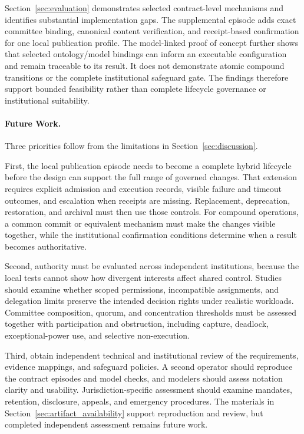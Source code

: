 \documentclass[journal]{IEEEtran}
\begin{document}
Section~\ref{sec:evaluation} demonstrates selected contract-level
mechanisms and identifies substantial implementation gaps.
The supplemental episode adds exact committee binding,
canonical content verification, and receipt-based confirmation
for one local publication profile. The model-linked proof of concept
further shows that selected ontology/model bindings can inform an
executable configuration and remain traceable to its result. It does not demonstrate
atomic compound transitions or the complete institutional
safeguard gate. The findings therefore support bounded
feasibility rather than complete lifecycle governance
or institutional suitability.

\paragraph{Future Work.}

Three priorities follow from the limitations in
Section~\ref{sec:discussion}.

First, the local publication episode needs to become a complete hybrid
lifecycle before the design can support the full range of governed changes.
That extension requires explicit admission and execution records, visible
failure and timeout outcomes, and escalation when receipts are missing.
Replacement, deprecation, restoration, and archival must then use those
controls. For compound operations, a common commit or equivalent mechanism
must make the changes visible together, while the institutional confirmation
conditions determine when a result becomes authoritative.

Second, authority must be evaluated across independent institutions,
because the local tests cannot show how divergent interests affect shared
control. Studies should examine whether scoped permissions, incompatible
assignments, and delegation limits preserve the intended decision rights
under realistic workloads. Committee composition, quorum, and concentration
thresholds must be assessed together with participation and obstruction,
including capture, deadlock, exceptional-power use, and selective non-execution.

Third, obtain independent technical and institutional review
of the requirements, evidence mappings, and safeguard policies.
A second operator should reproduce the contract episodes and
model checks, and modelers should assess notation clarity and
usability. Jurisdiction-specific assessment should examine mandates,
retention, disclosure, appeals, and emergency procedures.
The materials in Section~\ref{sec:artifact_availability}
support reproduction and review, but completed independent
assessment remains future work.
\end{document}
